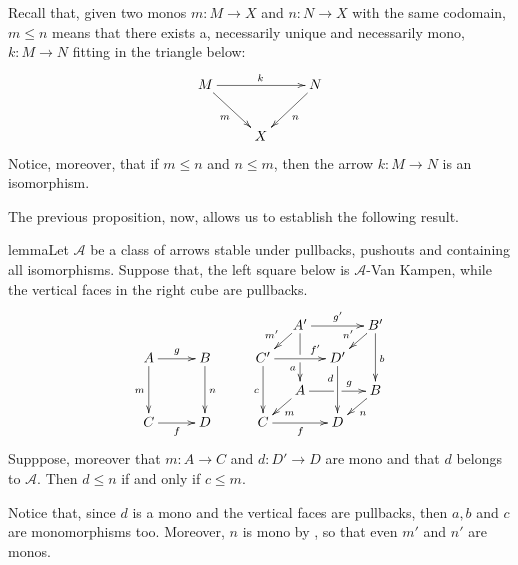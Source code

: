\documentclass[a4paper,UKenglish,cleveref,pdftex, thm-restate,numberwithinsect]{lipics}
\def\C{\textbf {\textup{C}}}
\begin{document}
Recall that, given two monos $m:M\to X$ and $n:N\to X$ with the same codomain, $m\leq n$ means that there exists a, necessarily unique and necessarily mono, $k:M\to N$ fitting in the triangle below:
\[\xymatrix{M\ar[rr]^{k}  \ar[dr]_{m}&& N \ar[dl]^{n}\\ & X}\]
Notice, moreover, that  if $m\leq n$ and $n\leq m$, then the arrow $k:M\to N$ is an isomorphism.  

The previous proposition, now, allows us to establish the following result.
\begin{theoremEnd}[category=sec2]{lemma}\label{lem:varie}Let $\mathcal{A}$ be a class of arrows stable under pullbacks, pushouts and containing all isomorphisms.  Suppose that, the left square below is $\mathcal{A}$-Van Kampen, while the vertical faces in the right cube are pullbacks.
		\[\xymatrix@C=10pt@R=10pt{&&&&&A'\ar[dd]|\hole_(.65){a}\ar[rr]^{g'} \ar[dl]_{m'} && B' \ar[dd]^{b} \ar[dl]_{n'} \\ A \ar[dd]_{m}\ar[rr]^{g}&&B\ar[dd]^{n}&&C'  \ar[dd]_{c}\ar[rr]^(.7){f'} & & D' \ar[dd]_(.3){d}\\&&&&&A\ar[rr]|\hole^(.65){g} \ar[dl]^{m} && B \ar[dl]^{n} \\C\ar[rr]_{f} &&D&&C \ar[rr]_{f} & & D}\]
Supppose, moreover that $m\colon A\to C$ and $d\colon D'\to D$ are mono and that $d$ belongs to $\mathcal{A}$. Then $d\leq n$ if and only if $c \leq m$.
\end{theoremEnd}

\begin{remark}
	Notice that, since $d$ is a mono and the vertical faces are pullbacks, then $a, b$ and $c$ are monomorphisms too. Moreover, $n$ is mono by , so that even $m'$ and $n'$ are monos.
\end{remark}
\end{document}
